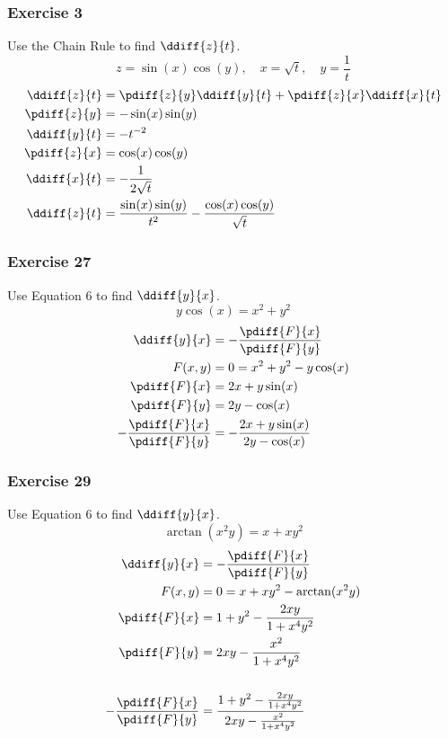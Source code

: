 \documentclass[letterpaper, 12pt]{math}
\begin{document}
\subsubsection*{Exercise 3}
Use the Chain Rule to find \( \ddiff{z}{t} \).
\[ z = \sin(x)\cos(y), \quad x = \sqrt{t}, \quad y = \frac{1}{t} \]
\begin{align*}
  \ddiff{z}{t} &= \pdiff{z}{y}\ddiff{y}{t}+\pdiff{z}{x}\ddiff{x}{t} \\
  \pdiff{z}{y} &= -\sin(x)\sin(y) \\
  \ddiff{y}{t} &= -t^{-2} \\
  \pdiff{z}{x} &= \cos(x)\cos(y) \\
  \ddiff{x}{t} &= -\frac{1}{2\sqrt{t}} \\
  \ddiff{z}{t} &= \frac{\sin(x)\sin(y)}{t^2}-\frac{\cos(x)\cos(y)}{\sqrt{t}}
\end{align*}

\subsubsection*{Exercise 27}
Use Equation 6 to find \( \ddiff{y}{x} \).
\[ y\cos(x) = x^2+y^2 \]
\begin{align*}
  \ddiff{y}{x} &= -\frac{\pdiff{F}{x}}{\pdiff{F}{y}} \\
  F(x,y) &= 0 = x^2+y^2-y\cos(x) \\
  \pdiff{F}{x} &= 2x+y\sin(x) \\
  \pdiff{F}{y} &= 2y-\cos(x) \\
  -\frac{\pdiff{F}{x}}{\pdiff{F}{y}} &= -\frac{2x+y\sin(x)}{2y-\cos(x)}
\end{align*}

\subsubsection*{Exercise 29}
Use Equation 6 to find \( \ddiff{y}{x} \).
\[ \arctan(x^2y) = x+xy^2 \]
\begin{align*}
  \ddiff{y}{x} &= -\frac{\pdiff{F}{x}}{\pdiff{F}{y}} \\
  F(x,y) &= 0 = x+xy^2-\arctan(x^2y) \\
  \pdiff{F}{x} &= 1+y^2-\frac{2xy}{1+x^4y^2} \\
  \pdiff{F}{y} &= 2xy-\frac{x^2}{1+x^4y^2} \\ \\
  -\frac{\pdiff{F}{x}}{\pdiff{F}{y}} &=
    \frac{1+y^2-\frac{2xy}{1+x^4y^2}}{2xy-\frac{x^2}{1+x^4y^2}}
\end{align*}
\end{document}
